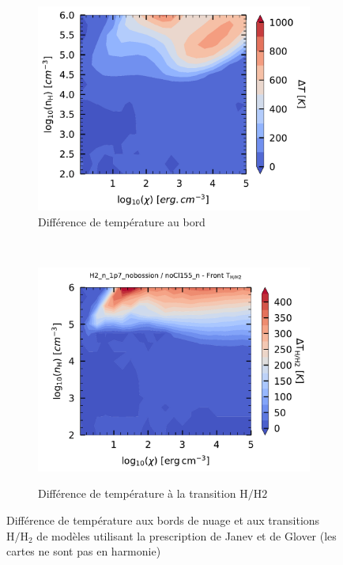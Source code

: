 \begin{figure}[!h]
    \centering
    \begin{subfigure}[t]{0.49\textwidth} %
        \centering \includegraphics[trim = {0 0 0 0 },clip,width=1\textwidth]{figure/H2/diffgrid_gloverjanev/mapTba_H2_n_1p7_nobossion_noCl155_n.pdf}
        \caption{Différence de température au bord}
        \label{fig:H2:JanevGlover:diffTba}
    \end{subfigure}
    ~ 
    \begin{subfigure}[t]{0.49\textwidth}
        \centering \includegraphics[trim = {0 0 0 1cm },clip,width=1\textwidth]{figure/H2/diffgrid_gloverjanev/HH2_T_H2_n_1p7_nobossion_noCl155_n.pdf}
        \label{fig:H2:JanevGlover:diffTmax}
        \caption{Différence de température à la transition $\mathrm{H}/\mathrm{H2}$}
        \label{fig:H2:JanevGlover:diffTHH2}
    \end{subfigure}
    \caption{Différence de température aux bords de nuage et aux transitions $\mathrm{H}/\mathrm{H}_2$ de modèles utilisant la prescription de Janev et de Glover (les cartes ne sont pas en harmonie)}
\end{figure}

